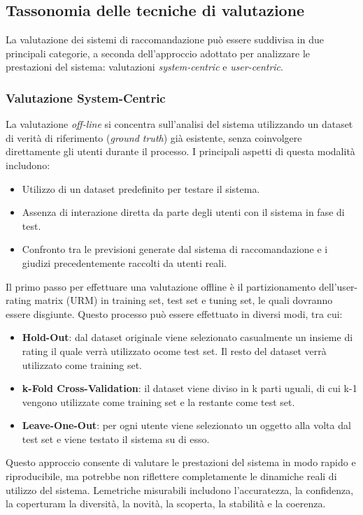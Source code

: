 \documentclass{report}
\begin{document}
	\subsection{Tassonomia delle tecniche di valutazione}
	La valutazione dei sistemi di raccomandazione può essere suddivisa in due principali categorie, a seconda dell’approccio adottato per analizzare le prestazioni del sistema: valutazioni \textit{system-centric} e \textit{user-centric}.
	
	\subsubsection{Valutazione System-Centric}
	La valutazione \textit{off-line} si concentra sull’analisi del sistema utilizzando un dataset di verità di riferimento (\textit{ground truth}) già esistente, senza coinvolgere direttamente gli utenti durante il processo. I principali aspetti di questa modalità includono:
	\begin{itemize}
		\item Utilizzo di un dataset predefinito per testare il sistema.
		\item Assenza di interazione diretta da parte degli utenti con il sistema in fase di test.
		\item Confronto tra le previsioni generate dal sistema di raccomandazione e i giudizi precedentemente raccolti da utenti reali.
	\end{itemize}
	Il primo passo per effettuare una valutazione offline è il partizionamento dell'user-rating matrix (URM) in training set, test set e tuning set, le quali dovranno essere disgiunte. Questo processo può essere effettuato in diversi modi, tra cui:
	\begin{itemize}
		\item \textbf{Hold-Out}: dal dataset originale viene selezionato casualmente un insieme di rating il quale verrà utilizzato ocome test set. Il resto del dataset verrà utilizzato come training set.
		\item \textbf{k-Fold Cross-Validation}: il dataset viene diviso in k parti uguali, di cui k-1 vengono utilizzate come training set e la restante come test set.
		\item \textbf{Leave-One-Out}: per ogni utente viene selezionato un oggetto alla volta dal test set e viene testato il sistema su di esso.
	\end{itemize}
	Questo approccio consente di valutare le prestazioni del sistema in modo rapido e riproducibile, ma potrebbe non riflettere completamente le dinamiche reali di utilizzo del sistema. Lemetriche misurabili includono l'accuratezza, la confidenza, la coperturam la diversità, la novità, la scoperta, la stabilità e la coerenza.
\end{document}
